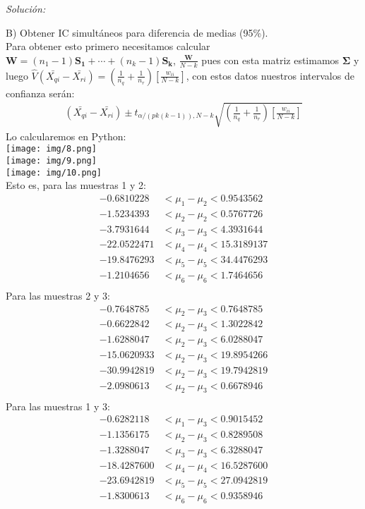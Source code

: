 \documentclass[12pt]{article}
\newenvironment{sol}
    {\emph{Solución:}
    }
    {
    }
\begin{document}
\begin{sol}
B) Obtener IC simultáneos para diferencia de medias (95\%).\\
Para obtener esto primero necesitamos calcular $\bm{W}=(n_1-1)\bm{S_1}+\cdots+(n_k-1)\bm{S_k}$, $\frac{\bm{W}}{N-k}$ pues con esta matriz estimamos $\bm{\Sigma}$ y luego $\hat{V}(\bar{X_{qi}}-\bar{X_{ri}})=(\frac{1}{n_q}+\frac{1}{n_r})[\frac{w_{ii}}{N-k}]$, con estos datos nuestros intervalos de confianza serán:
\begin{align*}
(\bar{X_{qi}}-\bar{X_{ri}}) \pm t_{\alpha/(pk(k-1)),N-k}\sqrt{(\frac{1}{n_q}+\frac{1}{n_r})[\frac{w_{ii}}{N-k}]}
\end{align*}
Lo calcularemos en Python:\\
\texttt{[image: img/8.png]}\\
\texttt{[image: img/9.png]}\\
\texttt{[image: img/10.png]}\\
Esto es, para las muestras 1 y 2:
\begin{align*}
-0.6810228 &< \mu_{1} - \mu_{2} < 0.9543562 \\
-1.5234393 &< \mu_{2} - \mu_{2} < 0.5767726 \\
-3.7931644 &< \mu_{3} - \mu_{3} < 4.3931644 \\
-22.0522471 &< \mu_{4} - \mu_{4} < 15.3189137 \\
-19.8476293 &< \mu_{5} - \mu_{5} < 34.4476293 \\
-1.2104656 &< \mu_{6} - \mu_{6} < 1.7464656 \\
\end{align*}
Para las muestras 2 y 3:
\begin{align*}
-0.7648785 &< \mu_{2} - \mu_{3} < 0.7648785 \\
-0.6622842 &< \mu_{2} - \mu_{3} < 1.3022842 \\
-1.6288047 &< \mu_{2} - \mu_{3} < 6.0288047 \\
-15.0620933 &< \mu_{2} - \mu_{3} < 19.8954266 \\
-30.9942819 &< \mu_{2} - \mu_{3} < 19.7942819 \\
-2.0980613 &< \mu_{2} - \mu_{3} < 0.6678946 \\
\end{align*}
Para las muestras 1 y 3:
\begin{align*}
-0.6282118 &< \mu_{1} - \mu_{3} < 0.9015452 \\
-1.1356175 &< \mu_{2} - \mu_{3} < 0.8289508 \\
-1.3288047 &< \mu_{3} - \mu_{3} < 6.3288047 \\
-18.4287600 &< \mu_{4} - \mu_{4} < 16.5287600 \\
-23.6942819 &< \mu_{5} - \mu_{5} < 27.0942819 \\
-1.8300613 &< \mu_{6} - \mu_{6} < 0.9358946 \\
\end{align*}


\end{sol}
\end{document}
